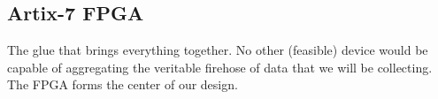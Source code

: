 \subsection{Artix-7 FPGA}
	The glue that brings everything together. No other (feasible) device would be capable of aggregating the veritable firehose of data that we will be collecting. The FPGA forms the center of our design.